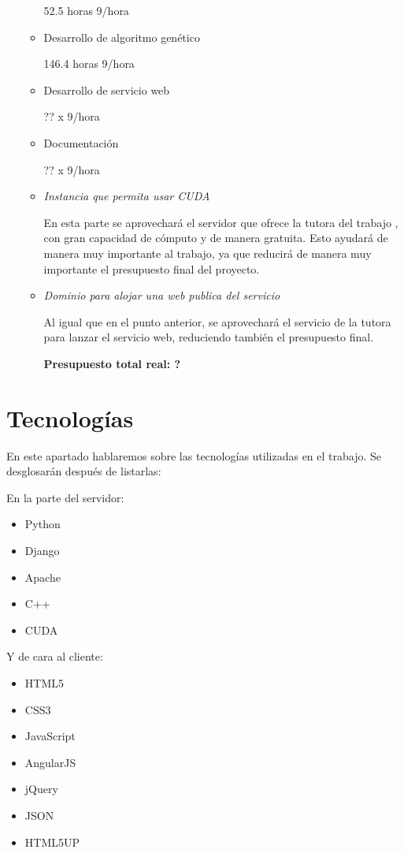 \begin{itemize}
\begin{itemize}
		52.5 horas 9\officialeuro/hora
		
		\item Desarrollo de algoritmo genético
		
		146.4 horas 9\officialeuro/hora
		
		\item Desarrollo de servicio web
		
		?? x 9\officialeuro/hora
		
		\item Documentación

		?? x 9\officialeuro/hora
		
		\item \textit{Instancia que permita usar CUDA}
		
		En esta parte se aprovechará el servidor que ofrece la tutora del trabajo {\tutor}, con gran capacidad de cómputo y de manera gratuita. Esto ayudará de manera muy importante al trabajo, ya que reducirá de manera muy importante el presupuesto final del proyecto.
		
		\item \textit{Dominio para alojar una web publica del servicio}
		
		Al igual que en el punto anterior, se aprovechará el servicio de la tutora para lanzar el servicio web, reduciendo también el presupuesto final.
		
		\bigskip
		\textbf{Presupuesto total real: ? \officialeuro}
		
	\end{itemize}

\end{itemize}



\newpage
\section{Tecnologías}

En este apartado hablaremos sobre las tecnologías utilizadas en el trabajo. Se desglosarán después de listarlas:

\bigskip
En la parte del servidor:
\begin{itemize}
	\item Python
	\item Django
	\item Apache
	\item C++
	\item CUDA
\end{itemize}

Y de cara al cliente:
\begin{itemize}
	\item HTML5
	\item CSS3
	\item JavaScript
	\item AngularJS
	\item jQuery
	\item JSON
	\item HTML5UP
\end{itemize}

